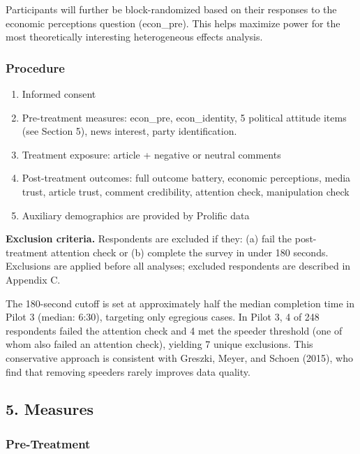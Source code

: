 \documentclass[
  12pt]{article}
\providecommand{\tightlist}{%
  \setlength{\itemsep}{0pt}\setlength{\parskip}{0pt}}
\begin{document}
Participants will further be block-randomized based on their responses
to the economic perceptions question (econ\_pre). This helps maximize
power for the most theoretically interesting heterogeneous effects
analysis.

\subsubsection{Procedure}\label{procedure}

\begin{enumerate}
\def\labelenumi{\arabic{enumi}.}
\tightlist
\item
  Informed consent
\item
  Pre-treatment measures: econ\_pre, econ\_identity, 5 political
  attitude items (see Section 5), news interest, party identification.
\item
  Treatment exposure: article + negative or neutral comments
\item
  Post-treatment outcomes: full outcome battery, economic perceptions,
  media trust, article trust, comment credibility, attention check,
  manipulation check
\item
  Auxiliary demographics are provided by Prolific data
\end{enumerate}

\textbf{Exclusion criteria.} Respondents are excluded if they: (a) fail
the post-treatment attention check or (b) complete the survey in under
180 seconds. Exclusions are applied before all analyses; excluded
respondents are described in Appendix C.

The 180-second cutoff is set at approximately half the median completion
time in Pilot 3 (median: 6:30), targeting only egregious cases. In Pilot
3, 4 of 248 respondents failed the attention check and 4 met the speeder
threshold (one of whom also failed an attention check), yielding 7
unique exclusions. This conservative approach is consistent with
Greszki, Meyer, and Schoen (2015), who find that removing speeders
rarely improves data quality.

\subsection{5. Measures}\label{measures}

\subsubsection{Pre-Treatment}\label{pre-treatment}
\end{document}
